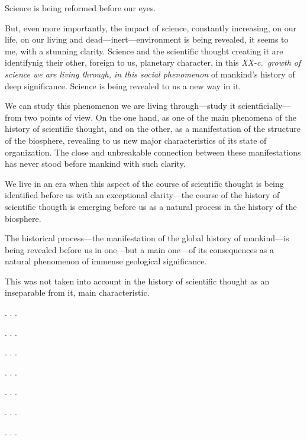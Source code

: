 Science is being reformed before our eyes.

But, even more importantly, the impact of science, constantly increasing, on
our life, on our living and dead---inert---environment is being revealed, it
seems to me, with a stunning clarity.  Science and the scientific thought
creating it are identifynig their other, foreign to us, planetary character, in
this \emph{XX-c.\ growth of science we are living through, in this social
phenomenon} of mankind's history of deep significance.  Science is being
revealed to us a new way in it.

We can study this phenomenon we are living through---study it
scientficially---from two points of view.  On the one hand, as one of the main
phenomena of the history of scientific thought, and on the other, as a
manifestation of the structure of the biosphere, revealing to us new major
characteristics of its state of organization.
The close and unbreakable connection between these manifestations has never
stood before mankind with such clarity.

We live in an era when this aspect of the course of scientific thought is being
identified before us with an exceptional clarity---the course of the history of
scientific thougth is emerging before us as a natural process in the history of
the biosphere.

The historical process---the manifestation of the global history of
mankind---is being revealed before us in one---but a main one---of its
consequences as a natural phenomenon of immense geological significance.

This was not taken into account in the history of scientific thought as an
inseparable from it, main characteristic.


\Section %

. . .

\Section %

. . .

\Section %

. . .

\Section %

. . .

\Section %

. . .

\Section %

. . .

\Section %

. . .

\Section %

